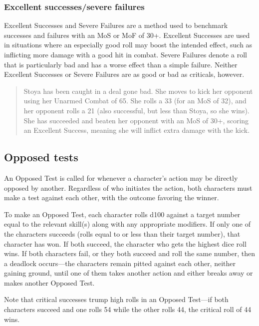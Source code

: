 \subsubsection{Excellent successes/severe failures}
\label{sec:excell-succ-fail}

Excellent Successes and Severe Failures are a method used to benchmark successes and failures with an MoS or MoF of 30+. Excellent Successes are used in situations where an especially good roll may boost the intended effect, such as inflicting more damage with a good hit in combat. Severe Failures denote a roll that is particularly bad and has a worse effect than a simple failure. Neither Excellent Successes or Severe Failures are as good or bad as criticals, however.

\begin{quotation}
Stoya has been caught in a deal gone bad. She moves to kick her opponent using her Unarmed Combat of 65. She rolls a 33 (for an MoS of 32), and her opponent rolls a 21 (also successful, but less than Stoya, so she wins). She has succeeded and beaten her opponent with an MoS of 30+, scoring an Excellent Success, meaning she will inflict extra damage with the kick.
\end{quotation}

\subsection{Opposed tests}
\label{sec:opposed-tests}

An Opposed Test is called for whenever a character's action may be directly opposed by another. Regardless of who initiates the action, both characters must make a test against each other, with the outcome favoring the winner.

To make an Opposed Test, each character rolls d100 against a target number equal to the relevant skill(s) along with any appropriate modifiers. If only one of the characters succeeds (rolls equal to or less than their target number), that character has won. If both succeed, the character who gets the highest dice roll wins. If both characters fail, or they both succeed and roll the same number, then a deadlock occurs—the characters remain pitted against each other, neither gaining ground, until one of them takes another action and either breaks away or makes another Opposed Test.

Note that critical successes trump high rolls in an Opposed Test—if both characters succeed and one rolls 54 while the other rolls 44, the critical roll of 44 wins.

